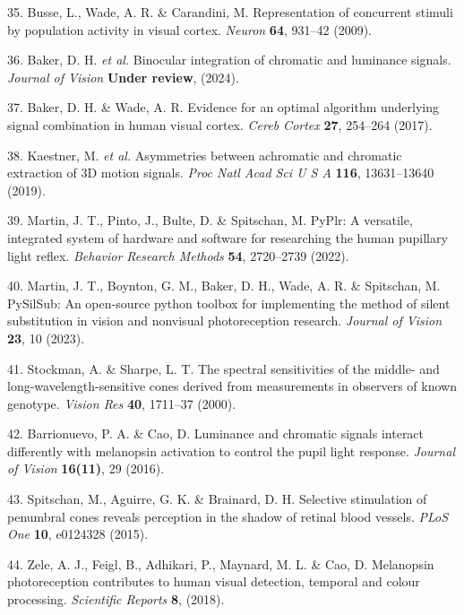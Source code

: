 \documentclass[
]{article}
\begin{document}
\leavevmode\hypertarget{ref-Busse2009}{}%
35. Busse, L., Wade, A. R. \& Carandini, M. Representation of concurrent stimuli by population activity in visual cortex. \emph{Neuron} \textbf{64}, 931--42 (2009).

\leavevmode\hypertarget{ref-Baker2024}{}%
36. Baker, D. H. \emph{et al.} Binocular integration of chromatic and luminance signals. \emph{Journal of Vision} \textbf{Under review}, (2024).

\leavevmode\hypertarget{ref-Baker2017}{}%
37. Baker, D. H. \& Wade, A. R. Evidence for an optimal algorithm underlying signal combination in human visual cortex. \emph{Cereb Cortex} \textbf{27}, 254--264 (2017).

\leavevmode\hypertarget{ref-Kaestner2019}{}%
38. Kaestner, M. \emph{et al.} Asymmetries between achromatic and chromatic extraction of 3D motion signals. \emph{Proc Natl Acad Sci U S A} \textbf{116}, 13631--13640 (2019).

\leavevmode\hypertarget{ref-Martin2022}{}%
39. Martin, J. T., Pinto, J., Bulte, D. \& Spitschan, M. PyPlr: A versatile, integrated system of hardware and software for researching the human pupillary light reflex. \emph{Behavior Research Methods} \textbf{54}, 2720--2739 (2022).

\leavevmode\hypertarget{ref-Martin2023}{}%
40. Martin, J. T., Boynton, G. M., Baker, D. H., Wade, A. R. \& Spitschan, M. PySilSub: An open-source python toolbox for implementing the method of silent substitution in vision and nonvisual photoreception research. \emph{Journal of Vision} \textbf{23}, 10 (2023).

\leavevmode\hypertarget{ref-Stockman2000}{}%
41. Stockman, A. \& Sharpe, L. T. The spectral sensitivities of the middle- and long-wavelength-sensitive cones derived from measurements in observers of known genotype. \emph{Vision Res} \textbf{40}, 1711--37 (2000).

\leavevmode\hypertarget{ref-Barrionuevo2016}{}%
42. Barrionuevo, P. A. \& Cao, D. Luminance and chromatic signals interact differently with melanopsin activation to control the pupil light response. \emph{Journal of Vision} \textbf{16(11)}, 29 (2016).

\leavevmode\hypertarget{ref-Spitschan2015}{}%
43. Spitschan, M., Aguirre, G. K. \& Brainard, D. H. Selective stimulation of penumbral cones reveals perception in the shadow of retinal blood vessels. \emph{PLoS One} \textbf{10}, e0124328 (2015).

\leavevmode\hypertarget{ref-Zele2018}{}%
44. Zele, A. J., Feigl, B., Adhikari, P., Maynard, M. L. \& Cao, D. Melanopsin photoreception contributes to human visual detection, temporal and colour processing. \emph{Scientific Reports} \textbf{8}, (2018).
\end{document}
